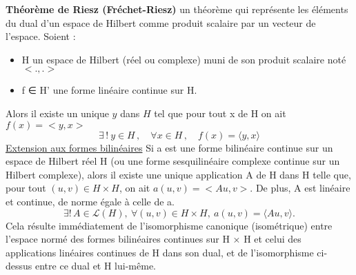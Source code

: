 \documentclass[openany]{book}
\begin{document}
\textbf{Th\'eor\`eme de Riesz (Fr\'echet-Riesz)}\newline
un th\'eor\`eme qui repr\'esente les \'el\'ements du dual d'un espace de Hilbert comme produit scalaire par un vecteur de l'espace.
Soient :
\begin{itemize}
		\item H un espace de Hilbert (r\'eel ou complexe) muni de son produit scalaire not\'e $<.,.>$
		\item f ∈ H' une forme lin\'eaire continue sur H.
\end{itemize}
Alors il existe un unique $y$ dans $H$ tel que pour tout x de H on ait $f(x) = <y, x>$
$$
\exists\,!\ y \in H\,, \quad \forall x\in H\,, \quad f(x) = \langle y,x\rangle
$$
\underline{Extension aux formes bilin\'eaires}\newline
Si a est une forme bilin\'eaire continue sur un espace de Hilbert r\'eel H (ou une forme sesquilin\'eaire complexe continue sur un Hilbert complexe), alors il existe une unique application A de H dans H telle que, pour tout $(u, v) \in H \times H$, on ait $a(u, v) = <Au, v>$. De plus, A est lin\'eaire et continue, de norme \'egale \`a celle de a.
$$
\exists !\,A\in\mathcal{L}(H),\ \forall (u,v)\in H\times H,\ a(u,v)=\langle Au,v \rangle.
$$
Cela r\'esulte imm\'ediatement de l'isomorphisme canonique (isom\'etrique) entre l'espace norm\'e des formes bilin\'eaires continues sur H × H et celui des applications lin\'eaires continues de H dans son dual, et de l'isomorphisme ci-dessus entre ce dual et H lui-m\^eme.
\bigskip
\end{document}
